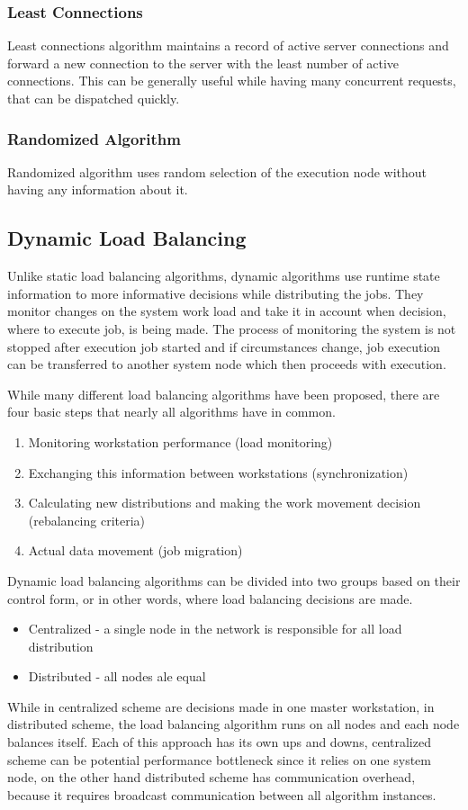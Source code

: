 \subsubsection{Least Connections}
Least connections algorithm maintains a record of active server connections
and forward a new connection to the server with the least number of active connections\cite{web:ibmLoadBalancingDecisions}.
This can be generally useful while having many concurrent requests, that can be dispatched quickly.

\subsubsection{Randomized Algorithm}
Randomized algorithm uses random selection of the execution node without having any information about it.

\subsection{Dynamic Load Balancing}\label{subsec:dynamic-load-balancing}
Unlike static load balancing algorithms, dynamic algorithms use runtime state information to more informative decisions while distributing the jobs.
They monitor changes on the system work load and take it in account when decision, where to execute job, is being made.
The process of monitoring the system is not stopped after execution job started and if circumstances change,
job execution can be transferred to another system node which then proceeds with execution.

While many different load balancing algorithms have been proposed, there are four basic steps that nearly all algorithms have in common\cite{malik2000dynamic}.
\begin{enumerate}
    \item Monitoring workstation performance (load monitoring)
    \item Exchanging this information between workstations (synchronization)
    \item Calculating new distributions and making the work movement decision (rebalancing criteria)
    \item Actual data movement (job migration)
\end{enumerate}
Dynamic load balancing algorithms can be divided into two groups based on their control form,
or in other words, where load balancing decisions are made\cite{malik2000dynamic}.
\begin{itemize}
    \item Centralized - a single node in the network is responsible for all load distribution
    \item Distributed - all nodes ale equal
\end{itemize}
While in centralized scheme are decisions made in one master workstation,
in distributed scheme, the load balancing algorithm runs on all nodes
and each node balances itself.
Each of this approach has its own ups and downs,
centralized scheme can be potential performance bottleneck
since it relies on one system node,
on the other hand distributed scheme has communication overhead,
because it requires broadcast communication between all algorithm instances.

